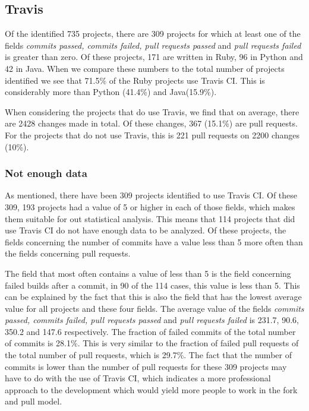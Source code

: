 \subsection{Travis}
Of the identified 735 projects, there are 309 projects for which at least one of the fields \textit{commits passed, commits failed, pull requests passed} and \textit{pull requests failed} is greater than zero. 
Of these projects, 171 are written in Ruby, 96 in Python and 42 in Java. 
When we compare these numbers to the total number of projects identified we see that 71.5\% of the Ruby projects use Travis CI.
This is considerably more than Python (41.4\%) and Java(15.9\%).

When considering the projects that do use Travis, we find that on average, there are 2428 changes made in total. 
Of these changes, 367 (15.1\%) are pull requests.
For the projects that do not use Travis, this is 221 pull requests on 2200 changes (10\%).


\subsubsection*{Not enough data}
As mentioned, there have been 309 projects identified to use Travis CI.
Of these 309, 193 projects had a value of 5 or higher in each of those fields, which makes them suitable for out statistical analysis.
This means that 114 projects that did use Travis CI do not have enough data to be analyzed. 
Of these projects, the fields concerning the number of commits have a value less than 5 more often than the fields concerning pull requests.

The field that most often contains a value of less than 5 is the field concerning failed builds after a commit, in 90 of the 114 cases, this value is less than 5.
This can be explained by the fact that this is also the field that has the lowest average value for all projects and these four fields. 
The average value of the fields \textit{commits passed, commits failed, pull requests passed} and \textit{pull requests failed} is 231.7, 90.6, 350.2 and 147.6 respectively.
The fraction of failed commits of the total number of commits is 28.1\%. This is very similar to the fraction of failed pull requests of the total number of pull requests, which is 29.7\%.
The fact that the number of commits is lower than the number of pull requests for these 309 projects may have to do with the use of Travis CI, which indicates a more professional approach to the development which would yield more people to work in the fork and pull model.

